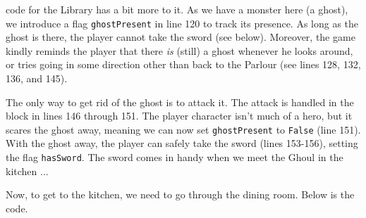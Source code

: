  code for the Library has a bit more to it. As we have a monster here (a ghost), we introduce a flag \texttt{ghostPresent} in line 120 to track its presence. As long as the ghost is there, the player cannot take the sword (see below). Moreover, the game kindly reminds the player that there \emph{is} (still) a ghost whenever he looks around, or tries going in some direction other than back to the Parlour (see lines 128, 132, 136, and 145).   

The only way to get rid of the ghost is to attack it. The attack is handled in the block in lines 146 through 151. The player character isn't much of a hero, but it scares the ghost away, meaning we can now set \texttt{ghostPresent} to \texttt{False} (line 151). With the ghost away, the player can safely take the sword (lines 153-156), setting the flag \texttt{hasSword}. The sword comes in handy when we meet the Ghoul in the kitchen ... 

Now, to get to the kitchen, we need to go through the dining room. Below is the code. 

